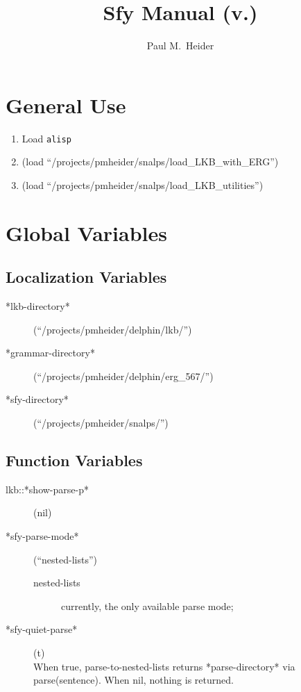 \documentclass{article}
\title{Sfy Manual (v.)}
\author{Paul M.\ Heider}
\begin{document}
\maketitle

\section{General Use}

  \begin{enumerate}
    \item Load \texttt{alisp}
    \item (load ``/projects/pmheider/snalps/load\_LKB\_with\_ERG'')
    \item (load ``/projects/pmheider/snalps/load\_LKB\_utilities'')

  \end{enumerate}

\section{Global Variables}

\subsection{Localization Variables}

  \begin{description}
    \item[*lkb-directory*] (``/projects/pmheider/delphin/lkb/'')
    \item[*grammar-directory*] (``/projects/pmheider/delphin/erg\_567/'')
    \item[*sfy-directory*] (``/projects/pmheider/snalps/'')
  \end{description}

\subsection{Function Variables}

  \begin{description}
    \item[lkb::*show-parse-p*] (nil)
    \item[*sfy-parse-mode*] (``nested-lists'')
      \begin{description}
        \item[nested-lists] currently, the only available parse mode;
      \end{description}
    \item[*sfy-quiet-parse*] (t) \\
      When true, parse-to-nested-lists returns *parse-directory* via parse(sentence).  When nil, nothing is returned.
  \end{description}
\end{document}
